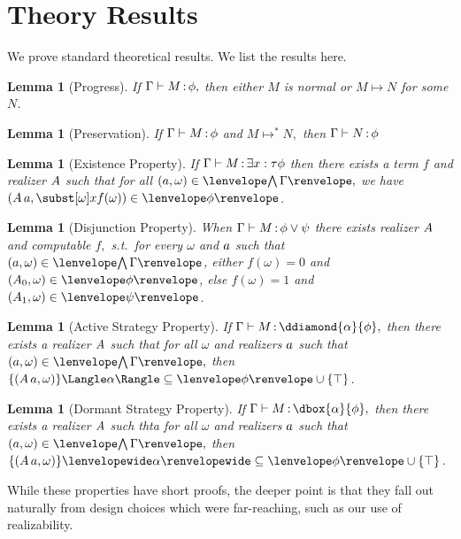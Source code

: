 \documentclass[12pt]{cmuthesis}
\newtheorem{lemma}[theorem]{Lemma}
\theoremstyle{definition}
\theoremstyle{remark}
\newcommand{\stepsto}{\mapsto}
\newcommand{\om}{\omega}
\newcommand{\G}{\Gamma}
\begin{document}
\section{Theory Results}
We prove standard theoretical results.
We list the results here.%

\begin{lemma}[Progress]
If $\proves{\Gamma}{M}{\phi},$ then either $M$ is normal or $M \stepsto N$ for some $N$.
\end{lemma}

\begin{lemma}[Preservation]
If $\proves{\Gamma}{M}{\phi}$ and $M \stepsto^* N,$ then $\proves{\Gamma}{N}{\phi}$
\end{lemma}

\begin{lemma}[Existence Property]
If $\proves{\Gamma}{M}{\exists{x:\tau}{\phi}}$ then there exists a term $f$ and realizer $\ab$ such that for all $(\aa,\om) \in \cintR{\G},$
we have 
$(\rzApp{\ab}{\aa},\ssub{\om}{x}{f(\om)}) \in \fintR{\phi}$.
\label{lem:term-ep}
\end{lemma}
\begin{lemma}[Disjunction Property]
When $\proves{\Gamma}{M}{\phi \lor \psi}$ there exists realizer $\ab$ and computable $f,$ s.t.\ for every $\om$ and $\aa$ such that $(\aa,\omega) \in \cintR{\G}$, either $f(\omega)=0$ and $(\rzFst{\ab},\omega) \in \fintR{\phi}{}$, else $f(\omega)=1$ and $(\rzSnd{\ab},\omega) \in \fintR{\psi}$.
\end{lemma}
\begin{lemma}[Active Strategy Property]
If $\proves{\Gamma}{M}{\ddiamond{\alpha}{\phi}},$ then there exists a realizer $\ab$ such that for all $\om$ and realizers $\aa$ such that $(\aa,\om) \in \cintR{\G},$ 
then $\strategyforR[\alpha]{\{(\rzApp{\ab}{\aa},\om)\}} \subseteq \fintR{\phi} \cup \{\stt\}$.
\end{lemma}
\begin{lemma}[Dormant Strategy Property]
If $\proves{\Gamma}{M}{\dbox{\alpha}{\phi}},$ then there exists a realizer $\ab$ such thta for all $\om$ and realizers $\aa$ such that $(\aa,\om) \in \cintR{\G},$ 
then $\dstrategyforR[\alpha]{\{(\rzApp{\ab}{\aa},\om)\}} \subseteq \fintR{\phi} \cup \{\stt\}$.
\end{lemma}
While these properties have short proofs, the deeper point is that they fall out naturally from design choices which were far-reaching, such as our use of realizability.
\end{document}
